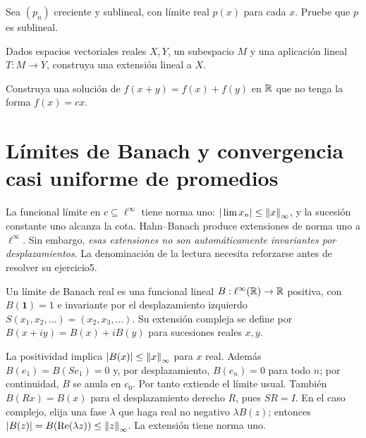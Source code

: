 \begin{ejercicio}\label{ej:v3-l01-2}
Sea $(p_n)$ creciente y sublineal, con límite real $p(x)$ para cada $x$. Pruebe que $p$ es sublineal.
\end{ejercicio}

\begin{ejercicio}\label{ej:v3-l01-3}
Dados espacios vectoriales reales $X,Y$, un subespacio $M$ y una aplicación lineal $T:M\to Y$, construya una extensión lineal a $X$.
\end{ejercicio}

\begin{ejercicio}\label{ej:v3-l01-4}
Construya una solución de $f(x+y)=f(x)+f(y)$ en $\mathbb R$ que no tenga la forma $f(x)=cx$.
\end{ejercicio}


\section{Límites de Banach y convergencia casi uniforme de promedios}
La funcional límite en $c\subseteq\ell^\infty$ tiene norma uno: $|\lim x_n|\leq\left\lVert x\right\rVert_\infty$, y la sucesión constante uno alcanza la cota. Hahn--Banach produce extensiones de norma uno a $\ell^\infty$. Sin embargo, \emph{esas extensiones no son automáticamente invariantes por desplazamientos}. La denominación de la lectura necesita reforzarse antes de resolver su ejercicio5.

\begin{definicion}
Un límite de Banach real es una funcional lineal $B:\ell^\infty(\mathbb R)\to\mathbb R$ positiva, con $B(\mathbf1)=1$ e invariante por el desplazamiento izquierdo $S(x_1,x_2,\ldots)=(x_2,x_3,\ldots)$. Su extensión compleja se define por $B(x+iy)=B(x)+iB(y)$ para sucesiones reales $x,y$.
\end{definicion}
La positividad implica $|B(x)|\leq\left\lVert x\right\rVert_\infty$ para $x$ real. Además $B(e_1)=B(Se_1)=0$ y, por desplazamiento, $B(e_n)=0$ para todo $n$; por continuidad, $B$ se anula en $c_0$. Por tanto extiende el límite usual. También $B(Rx)=B(x)$ para el desplazamiento derecho $R$, pues $SR=I$. En el caso complejo, elija una fase $\lambda$ que haga real no negativo $\lambda B(z)$; entonces $|B(z)|=B(\operatorname{Re}(\lambda z))\leq\left\lVert z\right\rVert_\infty$. La extensión tiene norma uno.

